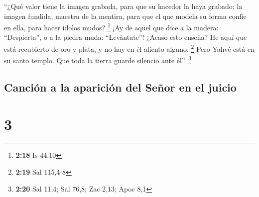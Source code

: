  ``¿Qué valor tiene la imagen grabada, para que su
hacedor la haya grabado; la imagen fundida, maestra de la mentira, para
que el que modela su forma confíe en ella, para hacer ídolos mudos?
\footnote{\textbf{2:18} Is 44,10}  ¡Ay de aquel que dice
a la madera: ``Despierta'', o a la piedra muda: ``Levántate''! ¿Acaso
esto enseña? He aquí que está recubierto de oro y plata, y no hay en él
aliento alguno. \footnote{\textbf{2:19} Sal 115,4-8} 
Pero Yahvé está en su santo templo. Que toda la tierra guarde silencio
ante él''. \footnote{\textbf{2:20} Sal 11,4; Sal 76,8; Zac 2,13; Apoc
  8,1}

\hypertarget{canciuxf3n-a-la-apariciuxf3n-del-seuxf1or-en-el-juicio}{%
\subsection{Canción a la aparición del Señor en el
juicio}\label{canciuxf3n-a-la-apariciuxf3n-del-seuxf1or-en-el-juicio}}

\hypertarget{section-2}{%
\section{3}\label{section-2}}

